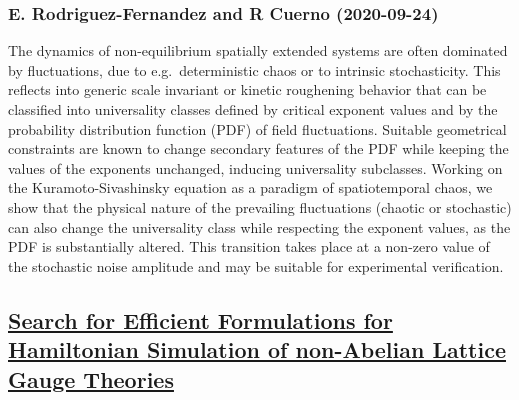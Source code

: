 \subsubsection*{E. Rodriguez-Fernandez and R Cuerno (2020-09-24)}
The dynamics of non-equilibrium spatially extended systems are often
dominated by fluctuations, due to e.g.\ deterministic chaos or to intrinsic
stochasticity. This reflects into generic scale invariant or kinetic roughening
behavior that can be classified into universality classes defined by critical
exponent values and by the probability distribution function (PDF) of field
fluctuations. Suitable geometrical constraints are known to change secondary
features of the PDF while keeping the values of the exponents unchanged,
inducing universality subclasses. Working on the Kuramoto-Sivashinsky equation
as a paradigm of spatiotemporal chaos, we show that the physical nature of the
prevailing fluctuations (chaotic or stochastic) can also change the
universality class while respecting the exponent values, as the PDF is
substantially altered. This transition takes place at a non-zero value of the
stochastic noise amplitude and may be suitable for experimental verification.

\subsection*{\href{http://arxiv.org/abs/2009.11802v1}{Search for Efficient Formulations for Hamiltonian Simulation of  non-Abelian Lattice Gauge Theories}}

